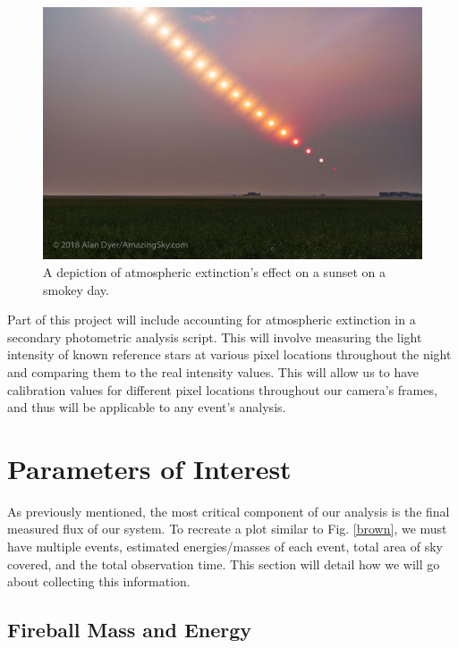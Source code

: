 \begin{figure}[ht!]
  \centering
  \includegraphics[scale=0.25]{images/sunset.jpg}
  \caption{A depiction of atmospheric extinction's effect on a sunset on a smokey day.}
  \label{extinc}
\end{figure}


Part of this project will include accounting for atmospheric extinction in a secondary photometric analysis script.
This will involve measuring the light intensity of known reference stars at various pixel locations throughout the night and comparing them to the real intensity values.
This will allow us to have calibration values for different pixel locations throughout our camera's frames, and thus will be applicable to any event's analysis.


\section{Parameters of Interest}

As previously mentioned, the most critical component of our analysis is the final measured flux of our system. 
To recreate a plot similar to Fig. \ref{brown}, we must have multiple events, estimated energies/masses of each event, total area of sky covered, and the total observation time.
This section will detail how we will go about collecting this information.


\subsection{Fireball Mass and Energy}

